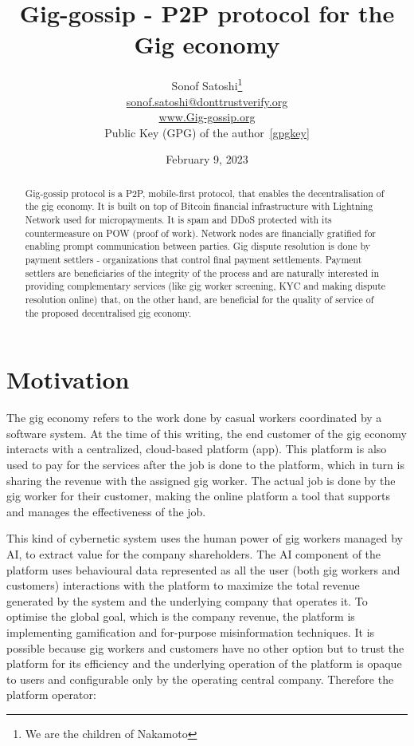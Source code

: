 \documentclass{article}
\title{Gig-gossip - P2P protocol for the Gig economy}
\date{February 9, 2023}
\author{
	{Sonof Satoshi}\thanks{We are the children of Nakamoto} \\
	\href{mailto:sonof.satoshi@donttrustverify.org}{sonof.satoshi@donttrustverify.org}\\
	\href{https://www.Gig-gossip.org}{www.Gig-gossip.org}\\
	Public Key (GPG) of the author~\ref{gpgkey} \\
}
\begin{document}
\maketitle

\begin{abstract}
Gig-gossip protocol is a P2P, mobile-first protocol, that enables the decentralisation of the gig economy. It is built on top of Bitcoin financial infrastructure with Lightning Network used for micropayments. It is spam and DDoS protected with its countermeasure on POW (proof of work). Network nodes are financially gratified for enabling prompt communication between parties. Gig dispute resolution is done by payment settlers - organizations that control final payment settlements. Payment settlers are beneficiaries of the integrity of the process and are naturally interested in providing complementary services (like gig worker screening, KYC and making dispute resolution online) that, on the other hand, are beneficial for the quality of service of the proposed decentralised gig economy.
\end{abstract}


\section{Motivation}
The gig economy refers to the work done by casual workers coordinated by a software system. At the time of this writing, the end customer of the gig economy interacts with a centralized, cloud-based platform (app). This platform is also used to pay for the services after the job is done to the platform, which in turn is sharing the revenue with the assigned gig worker. The actual job is done by the gig worker for their customer, making the online platform a tool that supports and manages the effectiveness of the job.

This kind of cybernetic system uses the human power of gig workers managed by AI, to extract value for the company shareholders. The AI component of the platform uses behavioural data represented as all the user (both gig workers and customers) interactions with the platform to maximize the total revenue generated by the system and the underlying company that operates it. To optimise the global goal, which is the company revenue, the platform is implementing gamification and for-purpose misinformation techniques. It is possible because gig workers and customers have no other option but to trust the platform for its efficiency and the underlying operation of the platform is opaque to users and configurable only by the operating central company. Therefore the platform operator:
\end{document}
